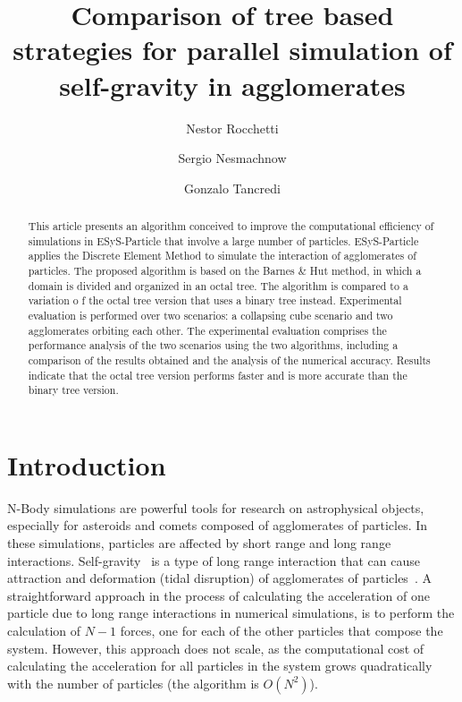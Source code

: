 \documentclass[runningheads]{llncs}
\begin{document}
%
\title{Comparison of tree based strategies for parallel simulation of self-gravity in agglomerates}
%
%
\author{Nestor Rocchetti \and
Sergio Nesmachnow \and
Gonzalo Tancredi}
%

%
\maketitle              %
%
\begin{abstract}
This article presents an algorithm conceived to improve the computational efficiency of simulations in ESyS-Particle  that involve a large number of particles. ESyS-Particle applies the Discrete Element Method to simulate the interaction of agglomerates of particles. The proposed algorithm is based on the Barnes \& Hut method, in which a domain is divided and organized in an octal tree. The algorithm is compared to a variation o f the octal tree version that uses a binary tree instead. Experimental evaluation is performed over two scenarios: a collapsing cube scenario and two agglomerates orbiting each other. The experimental evaluation comprises the performance analysis of the two scenarios using the two algorithms, including a comparison of the results obtained and the analysis of the numerical accuracy. Results indicate that the octal tree version performs faster and is more accurate than the binary tree version. 

\end{abstract}
%
%
%
\section{Introduction}
N-Body simulations are powerful tools for research on astrophysical objects, especially for asteroids and comets composed of agglomerates of particles. In these simulations, particles are affected by short range and long range interactions. Self-gravity~\cite{harris2009shapes,fujiwara2006rubble} is a type of long range interaction that can cause attraction and deformation (tidal disruption) of agglomerates of particles~\cite{walsh2012spin,goldreich2009tidal,rozitis2014cohesive}. A straightforward approach in the process of calculating the acceleration of one particle due to long range interactions in numerical simulations, is to perform the calculation of $N - 1$ forces, one for each of the other particles that compose the system. However, this approach does not scale, as the computational cost of calculating the acceleration for all particles in the system grows quadratically with the number of particles (the algorithm is $O(N^2)$).
 
\end{document}
